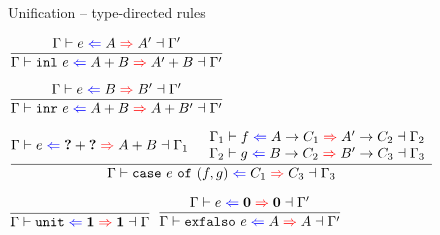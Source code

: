 \documentclass{beamer}
\begin{document}
\begin{frame}{Unification -- type-directed rules}

\begin{center}
  $\infrule{\uniftyping{e}{A}{A'}}{\uniftyping{\inl{e}}{\Sum{A}{B}}{\Sum{A'}{B}}}$

  \vspace{2em}

  $\infrule{\uniftyping{e}{B}{B'}}{\uniftyping{\inr{e}}{\Sum{A}{B}}{\Sum{A}{B'}}}$

  \vspace{2em}

  $\infrule{\fulluniftyping{\Gamma}{e}{\Sum{\Hole}{\Hole}}{\Sum{A}{B}}{\Gamma_1} \quad \begin{array}{c} \fulluniftyping{\Gamma_1}{f}{\Fun{A}{C_1}}{\Fun{A'}{C_2}}{\Gamma_2} \\ \fulluniftyping{\Gamma_2}{g}{\Fun{B}{C_2}}{\Fun{B'}{C_3}}{\Gamma_3} \end{array}}{\fulluniftyping{\Gamma}{\case{e}{f}{g}}{C_1}{C_3}{\Gamma_3}}$

  \vspace{2em}

  $\infrule{}{\fulluniftyping{\Gamma}{\unit}{\Unit}{\Unit}{\Gamma}}$
  \quad
  $\infrule{\uniftyping{e}{\Empty}{\Empty}}{\uniftyping{\exfalso{e}}{A}{A}}$
\end{center}

\end{frame}
\end{document}

